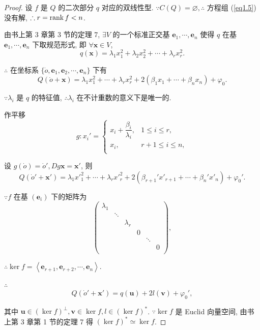 \documentclass[color=black,device=normal,lang=cn,mode=geye]{elegantnote}
\begin{document}
\begin{proof}
    设 $f$ 是 $Q$ 的二次部分 $q$ 对应的双线性型. $\because C(Q)=\varnothing,\therefore$ 方程组 (\ref{eq1.5}) 没有解, $\therefore r=\operatorname{rank} f<n$.

    由书上第 3 章第 3 节的定理 7, $\exists V$ 的一个标准正交基 $\boldsymbol{e}_1,\cdots,\boldsymbol{e}_n$ 使得 $q$ 在基 $\boldsymbol{e}_1,\cdots,\boldsymbol{e}_n$ 下取规范形式, 即 $\forall\boldsymbol{x}\in V$,
    \[q(\boldsymbol{x})=\lambda_1x^2_1+\lambda_2x^2_2+\cdots+\lambda_rx^2_r.\]

    $\therefore$ 在坐标系 $\{\dot{o},\boldsymbol{e}_1,\boldsymbol{e}_2,\cdots,\boldsymbol{e}_n\}$ 下有
    \[Q(\dot{o}+\boldsymbol{x})=\lambda_1x^2_1+\cdots+\lambda_rx^2_r+2(\beta_1x_1+\cdots+\beta_nx_n)+\varphi_0.\]

    $\because\lambda_i$ 是 $q$ 的特征值, $\therefore\lambda_i$ 在不计重数的意义下是唯一的.

    作平移
    \[g:x_i'=\begin{cases}
        x_i+\dfrac{\beta_i}{\lambda_i}, & 1\leq i\leq r, \\
        x_i, & r+1\leq i\leq n, \\
    \end{cases}\]

    设 $g(\dot{o})=\dot{o}',Dg\boldsymbol{x}=\boldsymbol{x}'$, 则
    \[Q(\dot{o}'+\boldsymbol{x}')=\lambda_1x'^2_1+\cdots+\lambda_rx'^2_r+2(\beta_{r+1}'x'_{r+1}+\cdots+\beta_n'x'_n)+\varphi_0'.\]

    $\because f$ 在基 $(\boldsymbol{e}_i)$ 下的矩阵为
    \[\begin{pmatrix}
        \lambda_1 \\
        & \ddots \\
        && \lambda_r \\
        &&& 0 \\
        &&&& \ddots \\
        &&&&& 0 \\
    \end{pmatrix},\]

    $\therefore\ker f=\left<\boldsymbol{e}_{r+1},\boldsymbol{e}_{r+2},\cdots,\boldsymbol{e}_n\right>$.

    $\therefore$
    \[Q(\dot{o}'+\boldsymbol{x}')=q(\boldsymbol{u})+2l(\boldsymbol{v})+\varphi_0',\]

    其中 $\boldsymbol{u}\in(\ker f)^\perp,\boldsymbol{v}\in\ker f,l\in(\ker f)^*$. $\because\ker f$ 是 Euclid 向量空间, 由书上第 3 章第 1 节的定理 7 得 $(\ker f)^*\simeq\ker f$.
    

\end{proof}
\end{document}

